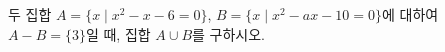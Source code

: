 두 집합 $A=\{x \mid x^2-x-6=0\}$, $B=\{x \mid x^2-ax-10=0\}$에 대하여 $A-B=\{3\}$일 때, 집합 $A\cup B$를 구하시오. 
